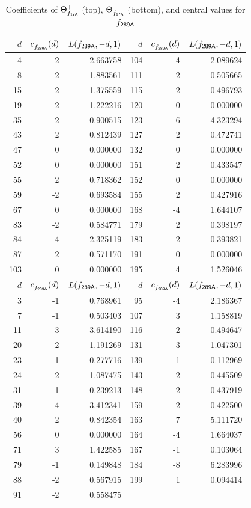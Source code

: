 \begin{table}
\begin{tabular}{||r|rr||r|rr||}
\hline
$d$ & $c^{}_{f_\mathsf{{289A}}}(d)$ & $L(f_\mathsf{{289A}},-d,1)$& $d$ & $c^{}_{f_\mathsf{{289A}}}(d)$ & $L(f_\mathsf{{289A}},-d,1)$\\
\hline
   4 & 2 & 2.663758 & 104 & 4 & 2.089624 \\
   8 & -2 & 1.883561 & 111 & -2 & 0.505665 \\
   15 & 2 & 1.375559 & 115 & 2 & 0.496793 \\
   19 & -2 & 1.222216 & 120 & 0 & 0.000000 \\
   35 & -2 & 0.900515 & 123 & -6 & 4.323294 \\
   43 & 2 & 0.812439 & 127 & 2 & 0.472741 \\
   47 & 0 & 0.000000 & 132 & 0 & 0.000000 \\
   52 & 0 & 0.000000 & 151 & 2 & 0.433547 \\
   55 & 2 & 0.718362 & 152 & 0 & 0.000000 \\
   59 & -2 & 0.693584 & 155 & 2 & 0.427916 \\
   67 & 0 & 0.000000 & 168 & -4 & 1.644107 \\
   83 & -2 & 0.584771 & 179 & 2 & 0.398197 \\
   84 & 4 & 2.325119 & 183 & -2 & 0.393821 \\
   87 & 2 & 0.571170 & 191 & 0 & 0.000000 \\
   103 & 0 & 0.000000 & 195 & 4 & 1.526046 \\
\hline
$d$ & $c^{}_{f_\mathsf{{289A}}}(d)$ & $L(f_\mathsf{{289A}},-d,1)$& $d$ & $c^{}_{f_\mathsf{{289A}}}(d)$ & $L(f_\mathsf{{289A}},-d,1)$\\
\hline
   3 & -1 & 0.768961 & 95 & -4 & 2.186367 \\
   7 & -1 & 0.503403 & 107 & 3 & 1.158819 \\
   11 & 3 & 3.614190 & 116 & 2 & 0.494647 \\
   20 & -2 & 1.191269 & 131 & -3 & 1.047301 \\
   23 & 1 & 0.277716 & 139 & -1 & 0.112969 \\
   24 & 2 & 1.087475 & 143 & -2 & 0.445509 \\
   31 & -1 & 0.239213 & 148 & -2 & 0.437919 \\
   39 & -4 & 3.412341 & 159 & 2 & 0.422500 \\
   40 & 2 & 0.842354 & 163 & 7 & 5.111720 \\
   56 & 0 & 0.000000 & 164 & -4 & 1.664037 \\
   71 & 3 & 1.422585 & 167 & -1 & 0.103064 \\
   79 & -1 & 0.149848 & 184 & -8 & 6.283996 \\
   88 & -2 & 0.567915 & 199 & 1 & 0.094414 \\
   91 & -2 & 0.558475 & & &  \\
\hline
\end{tabular}
\caption{Coefficients of
${\Theta}^+_{f_\mathsf{{17A}}}$ (top),
${\Theta}^-_{f_\mathsf{{17A}}}$ (bottom), and central values for $f_\mathsf{{289A}}$
          \label{table:dlcs:17A}}
\end{table}
